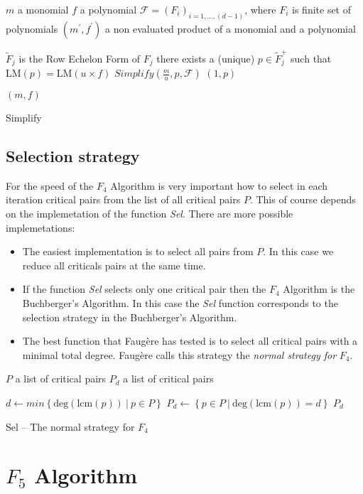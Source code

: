 \begin{algorithm}[ht]
  \begin{algorithmic}[1]
    \Require
      \Statex $m$ a monomial
      \Statex $f$ a polynomial
      \Statex $\mathcal{F} = (F_i)_{i=1,\ldots,(d-1)}$, where $F_i$ is finite set of polynomials
    \Ensure
      \Statex $(m^\prime, f^\prime)$ a non evaluated product of a monomial and a polynomial
      \Statex

        \State $\tilde{F}_j$ is the Row Echelon Form of $F_j$
        \State there exists a (unique) $p\in \tilde{F}^+_j$ such that $\textrm{LM}(p) = \textrm{LM}(u\times f)$
          \State \Return $Simplify(\frac{m}{u}, p, \mathcal{F})$
        \Else
          \State \Return $(1, p)$
        \EndIf
      \EndIf
    \EndFor

    \State \Return $(m, f)$

  \end{algorithmic}
  \caption{Simplify}
\end{algorithm}

\subsection{Selection strategy}
\label{subsec:F4:sel}
For the speed of the $F_4$ Algorithm is very important how to select in each iteration critical pairs from the list of all critical pairs $P$. This of course depends on the implemetation of the function \textit{Sel}. There are more possible implemetations:

\begin{itemize}
  \item The easiest implementation is to select all pairs from $P$. In this case we reduce all criticals pairs at the same time.
  \item If the function \textit{Sel} selects only one critical pair then the $F_4$ Algorithm is the Buchberger's Algorithm. In this case the \textit{Sel} function corresponds to the selection strategy in the Buchberger's Algorithm.
  \item The best function that Faug\`ere has tested is to select all critical pairs with a minimal total degree. Faug\`ere calls this strategy the \textit{normal strategy for} $F_4$.
\end{itemize}

\begin{algorithm}[ht]
  \begin{algorithmic}[1]
    \Require
      \Statex $P$ a list of critical pairs
    \Ensure
      \Statex $P_d$ a list of critical pairs
      \Statex

    \State $d \gets min\left\{\textrm{deg}(\textrm{lcm}(p))\ |\ p\in P\right\}$
    \State $P_d \gets \left\{p\in P\ |\ \textrm{deg}(\textrm{lcm}(p)) = d\right\}$
    \State \Return $P_d$
  \end{algorithmic}
  \caption{Sel -- The normal strategy for $F_4$}
\end{algorithm}

\section{$F_5$ Algorithm}
